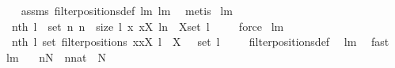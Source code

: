 \begin{isabellebody}
%
\isadelimproof
\ \ %
\endisadelimproof
%
\isatagproof
{}\isamarkupfalse%
\ assms\ filterpositions{}{\isacharunderscore}def\ lm{}{}{}\ lm{}{}{}\ \isamarkupfalse%
\ metis%
\endisatagproof
{\isafoldproof}%
%
\isadelimproof
\isanewline
%
\endisadelimproof
\isanewline
\isanewline
{}\isamarkupfalse%
\ lm{}{}{}{\isacharcolon}\ \isanewline
\ \ {\isachardoublequoteopen}{\isacharparenleft}nth\ l{\isacharparenright}\ {\isacharbackquote}\ set\ {\isacharparenleft}{\isacharbrackleft}n{\isachardot}\ n\ {\isasymleftarrow}\ {\isacharbrackleft}{}{\isachardot}{\isachardot}{\isacharless}size\ l{\isacharbrackright}{\isacharcomma}\ {\isacharparenleft}{\isacharpercent}x{\isachardot}\ x{\isasymin}X{\isacharparenright}\ {\isacharparenleft}l{\isacharbang}n{\isacharparenright}{\isacharbrackright}{\isacharparenright}\ {\isasymsubseteq}\ X{\isasyminter}set\ l{\isachardoublequoteclose}\ \isanewline
%
\isadelimproof
\ \ %
\endisadelimproof
%
\isatagproof
{}\isamarkupfalse%
\ force%
\endisatagproof
{\isafoldproof}%
%
\isadelimproof
\isanewline
%
\endisadelimproof
\isanewline
\isanewline
{}\isamarkupfalse%
\ lm{}{}{}{\isacharcolon}\ \isanewline
\ \ {\isachardoublequoteopen}{\isacharparenleft}nth\ l{\isacharparenright}{\isacharbackquote}\ set\ {\isacharparenleft}filterpositions{}\ {\isacharparenleft}{\isacharpercent}x{\isachardot}{\isacharparenleft}x{\isasymin}X{\isacharparenright}{\isacharparenright}\ l{\isacharparenright}\ {\isasymsubseteq}\ X\ {\isasyminter}\ \ set\ l{\isachardoublequoteclose}\ \isanewline
%
\isadelimproof
\ \ %
\endisadelimproof
%
\isatagproof
{}\isamarkupfalse%
\ filterpositions{}{\isacharunderscore}def\ \isamarkupfalse%
\ lm{}{}{}\ \isamarkupfalse%
\ fast%
\endisatagproof
{\isafoldproof}%
%
\isadelimproof
\isanewline
%
\endisadelimproof
\isanewline
{}\isamarkupfalse%
\ lm{}{}{}{\isacharcolon}\ \isanewline
\ \ {\isachardoublequoteopen}{\isacharparenleft}n{\isasymin}{\isacharbraceleft}{}{\isachardot}{\isachardot}{\isacharless}N{\isacharbraceright}{\isacharparenright}\ {\isacharequal}\ {\isacharparenleft}{\isacharparenleft}n{\isacharcolon}{\isacharcolon}nat{\isacharparenright}\ {\isacharless}\ N{\isacharparenright}{\isachardoublequoteclose}\ \isanewline

\end{isabellebody}
